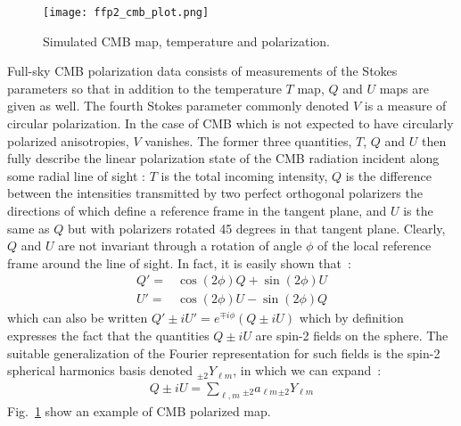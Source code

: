\begin{figure}[htb]
\texttt{[image: ffp2\_cmb\_plot.png]}
\caption{Simulated CMB map, temperature and polarization.}
\label{fig_ffp2_cmb_plot}
\end{figure}

Full-sky CMB polarization data consists of measurements of the Stokes parameters so that in addition 
to the temperature $T$ map, $Q$ and $U$ maps are given as well. The fourth Stokes parameter commonly denoted $V$ is a measure of circular polarization. 
In the case of CMB which is not expected to have circularly polarized anisotropies, $V$ vanishes. The former three quantities, $T$, $Q$ and $U$ then 
fully describe the linear polarization state of the CMB radiation incident along some radial line of sight : $T$ is the total incoming intensity, $Q$ is 
the difference between the intensities transmitted by two perfect orthogonal polarizers the directions of which define a reference frame in the tangent 
plane, and $U$ is the same as $Q$ but with polarizers rotated 45 degrees in that tangent plane. Clearly, $Q$ and $U$ are not invariant through a rotation 
of angle $\phi$ of the local reference frame around the line of sight. In fact, it is easily shown that~:
\begin{eqnarray}
Q ' = & \cos (2 \phi) Q + \sin(2 \phi) U \\ \nonumber
U ' = & \cos (2 \phi) U - \sin(2 \phi) Q 
\end{eqnarray}
which can also be written $Q' \pm i U' = e^{\mp i\phi} ( Q \pm i U )$ which by definition expresses the fact that the quantities $Q \pm i U$ are 
spin-2 fields on the sphere. The suitable generalization of the Fourier representation for such fields is the spin-2 spherical harmonics basis 
denoted $_{\pm 2}Y_{\ell m}$, in which we can expand~: 
\begin{eqnarray}\label{QU}
Q \pm i U  = \sum_{\ell, m} { _{\pm 2}a_{\ell m}} {_{\pm 2}Y_{\ell m} }
\end{eqnarray}
Fig.~\ref{fig_ffp2_cmb_plot} show an example of CMB polarized map.

